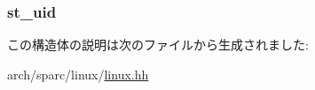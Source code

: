 \label{structSparc32Linux_1_1tgt__stat64_aec608d79c93ed6d010aec9f7487e0064}
\hypertarget{structSparc32Linux_1_1tgt__stat64_ad5477a292a4edf27aa5766e01e0f5d1f}{
\subsubsection[{st\_\-uid}]{ {\bf st\_\-uid}}}
\label{structSparc32Linux_1_1tgt__stat64_ad5477a292a4edf27aa5766e01e0f5d1f}


この構造体の説明は次のファイルから生成されました:\begin{DoxyCompactItemize}
\item 
arch/sparc/linux/\hyperlink{arch_2sparc_2linux_2linux_8hh}{linux.hh}\end{DoxyCompactItemize}
